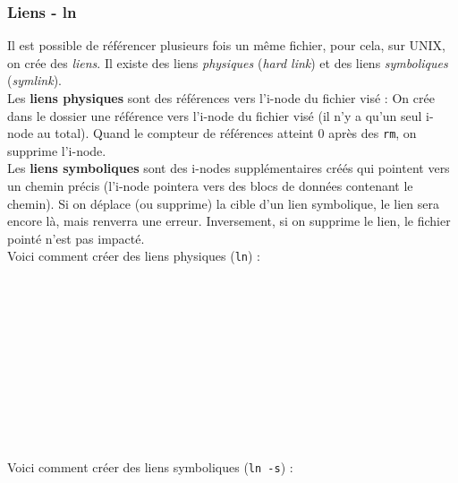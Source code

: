 \bigskip

\subsubsection{Liens - ln}

\bigskip

Il est possible de référencer plusieurs fois un même fichier, pour cela, sur UNIX, on crée des \textit{liens}.
Il existe des liens \textit{physiques} (\textit{hard link}) et des liens \textit{symboliques} (\textit{symlink}).\\

Les \textbf{liens physiques} sont des références vers l'i-node du fichier visé :
On crée dans le dossier une référence vers l'i-node du fichier visé (il n'y a qu'un seul i-node au total).
Quand le compteur de références atteint 0 après des \texttt{rm}, on supprime l'i-node.\\
Les \textbf{liens symboliques} sont des i-nodes supplémentaires créés qui pointent vers un chemin précis (l'i-node pointera vers des blocs de données contenant le chemin).
Si on déplace (ou supprime) la cible d'un lien symbolique, le lien sera encore là, mais renverra une erreur.
Inversement, si on supprime le lien, le fichier pointé n'est pas impacté.\\

Voici comment créer des liens physiques (\texttt{ln}) : \\

\\
\\
\\
\\
\\
\\
\\
\\
\\
\\
\\

Voici comment créer des liens symboliques (\texttt{ln -s}) : \\

\\
\\
\\
\\
\\
\\
\\
\\
\\
\\
\\
\\

